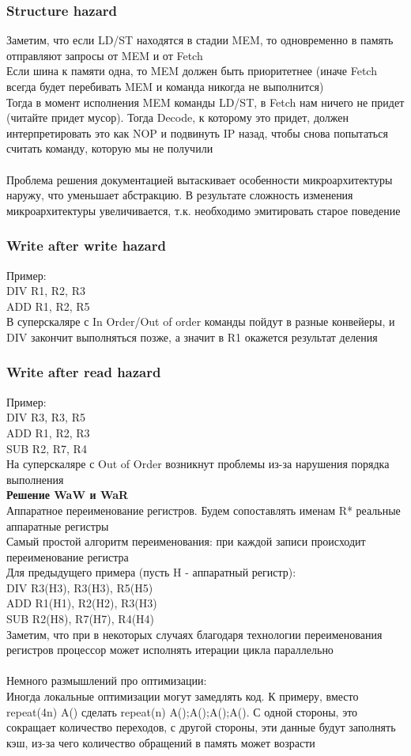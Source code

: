 \documentclass[12pt]{article}
\begin{document}
\subsubsection{Structure hazard}
Заметим, что если LD/ST находятся в стадии MEM, то одновременно в память отправляют запросы от MEM и от Fetch\\
Если шина к памяти одна, то MEM должен быть приоритетнее (иначе Fetch всегда будет перебивать MEM и команда никогда не выполнится)\\
Тогда в момент исполнения MEM команды LD/ST, в Fetch нам ничего не придет (читайте придет мусор). Тогда Decode, к которому это придет, должен интерпретировать это как NOP и подвинуть IP назад, чтобы снова попытаться считать команду, которую мы не получили\\\\
Проблема решения документацией вытаскивает особенности микроархитектуры наружу, что уменьшает абстракцию. В результате сложность изменения микроархитектуры увеличивается, т.к. необходимо эмитировать старое поведение
\subsubsection{Write after write hazard}
Пример:\\
DIV R1, R2, R3\\
ADD R1, R2, R5\\
В суперскаляре с In Order/Out of order команды пойдут в разные конвейеры, и DIV закончит выполняться позже, а значит в R1 окажется результат деления
\subsubsection{Write after read hazard}
Пример:\\
DIV R3, R3, R5\\
ADD R1, R2, R3\\
SUB R2, R7, R4\\
На суперскаляре с Out of Order возникнут проблемы из-за нарушения порядка выполнения\\
\textbf{Решение WaW и WaR}\\
Аппаратное переименование регистров. Будем сопоставлять именам R* реальные аппаратные регистры\\
Самый простой алгоритм переименования: при каждой записи происходит переименование регистра\\
Для предыдущего примера (пусть H - аппаратный регистр):\\
DIV R3(H3), R3(H3), R5(H5)\\
ADD R1(H1), R2(H2), R3(H3)\\
SUB R2(H8), R7(H7), R4(H4)\\
Заметим, что при в некоторых случаях благодаря технологии переименования регистров процессор может исполнять итерации цикла параллельно\\\\
Немного размышлений про оптимизации:\\
Иногда локальные оптимизации могут замедлять код. К примеру, вместо repeat(4n) A() сделать repeat(n) {A();A();A();A()}. С одной стороны, это сокращает количество переходов, с другой стороны, эти данные будут заполнять кэш, из-за чего количество обращений в память может возрасти
\end{document}
